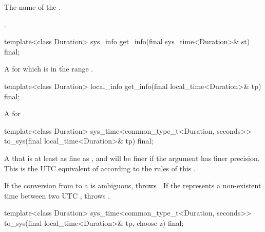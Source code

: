 \begin{itemdescr}
\pnum
\returns The name of the .

\pnum
\begin{example}
.
\end{example}
\end{itemdescr}

%
\begin{itemdecl}
template<class Duration>
  sys_info get_info(final sys_time<Duration>& st) final;
\end{itemdecl}

\begin{itemdescr}
\pnum
\returns
A   for which
 is in the range .
\end{itemdescr}

%
\begin{itemdecl}
template<class Duration>
  local_info get_info(final local_time<Duration>& tp) final;
\end{itemdecl}

\begin{itemdescr}
\pnum
\returns
A  for .
\end{itemdescr}

%
\begin{itemdecl}
template<class Duration>
  sys_time<common_type_t<Duration, seconds>>
    to_sys(final local_time<Duration>& tp) final;
\end{itemdecl}

\begin{itemdescr}
\pnum
\returns
A  that is at least as fine as ,
and will be finer if the argument  has finer precision.
This  is the UTC equivalent of 
according to the rules of this .

\pnum
\throws
If the conversion from  to a  is ambiguous,
throws .
If the  represents a non-existent time between two UTC ,
throws .
\end{itemdescr}

%
\begin{itemdecl}
template<class Duration>
  sys_time<common_type_t<Duration, seconds>>
    to_sys(final local_time<Duration>& tp, choose z) final;
\end{itemdecl}

